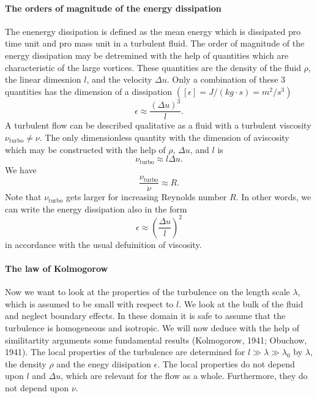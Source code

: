 \paragraph{The orders of magnitude of the energy dissipation}
The enenergy dissipation is defined as the mean energy which is dissipated pro
time unit and pro mass unit in a turbulent fluid. The order of magnitude of
the energy dissipation may be detremined with the help of quantities which are
characteristic of the large vortices. These quantities are the density of the
fluid $\rho$, the linear dimesnion $l$, and the velocity $\Delta u$. Only a
combination of these 3 quantities has the dimension of a dissipation
$([\epsilon] = J/(kg \cdot s) = m^2 /s^3)$
\begin{displaymath}
  \epsilon \approx \frac{(\Delta u)^3}{l}.
\end{displaymath}
A turbulent flow can be described qualitative as a fluid with a turbulent
viscosity $\nu_{\textrm{turbo}} \neq \nu$. The only dimensionless quantity
with the dimension of aviscosity which may be constructed with the help of 
$\rho$, $\Delta u$, and $l$ is
\begin{displaymath}
  \nu_{\textrm{turbo}} \approx l \Delta u.
\end{displaymath}
We have
\begin{displaymath}
  \frac{\nu_{\textrm{turbo}}}{\nu} \approx R.
\end{displaymath}
Note that $\nu_{\textrm{turbo}}$ gets larger for increasing Reynolds number
$R$. In other words, we can write the energy dissipation also in the form
\begin{displaymath}
  \epsilon \approx \left( \frac{\Delta u}{l} \right)^2 
\end{displaymath}
in accordance with the usual defuinition of viscosity.

\paragraph{The law of Kolmogorow} 
Now we want to look at the properties of the turbulence on the length scale 
$\lambda$, which is assumed to be small with respect to $l$. We look at the
bulk of the fluid and neglect boundary effects. In these domain it is safe to
assume that the turbulence is homogeneous and isotropic. We will now deduce
with the help of similitartity arguments some fundamental results (Kolmogorow,
1941; Obuchow, 1941). The local properties of the turbulence are determined for
$l \gg \lambda \gg \lambda_0$   by $\lambda$, the density $\rho$ and the enegy
diisipation $\epsilon$. The local properties do not depend upon $l$ and
$\Delta u$, which are relevant for the flow as a whole. Furthermore, they do
not depend upon $\nu$. 

